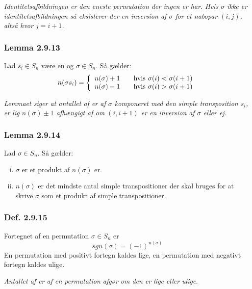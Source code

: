 \textit{Identitetsafbildningen er den eneste permutation der ingen
er har. Hvis $\sigma$ ikke er identitetsafbildningen så
eksisterer der en inversion af $\sigma$ for et nabopar $(i, j)$, altså hvor $j
= i + 1$.}

\subsubsection{Lemma 2.9.13}
Lad $s_i \in S_n$ være en  og $\sigma
\in S_n$. Så gælder:
\begin{equation*}
n(\sigma s_i) = \left\{
\begin{array}{l l}
n(\sigma) + 1 & \quad \text{hvis $\sigma(i) < \sigma(i + 1)$}\\
n(\sigma) - 1 & \quad \text{hvis $\sigma(i) > \sigma(i + 1)$}\\
\end{array} \right.
\end{equation*}

\textit{Lemmaet siger at antallet af er af $\sigma$
komponeret med den simple transposition $s_i$, er lig $n(\sigma) \pm 1$
afhængigt af om $(i, i + 1)$ er en inversion af $\sigma$ eller ej.}

\subsubsection{Lemma 2.9.14}
Lad $\sigma \in S_n$. Så gælder:
\begin{enumerate}[(i)]
  \item $\sigma$ er et produkt af $n(\sigma)$ er.
  \item $n(\sigma)$ er det mindste antal simple transpositioner der skal bruges
  for at skrive $\sigma$ som et produkt af simple transpositioner.
\end{enumerate}

\subsubsection{Def. 2.9.15}
Fortegnet af en permutation $\sigma \in S_n$ er
\begin{equation*}
  sgn(\sigma) = (-1)^{n(\sigma)}
\end{equation*}
En permutation med positivt fortegn kaldes lige, en permutation med negativt
fortegn kaldes ulige.

\textit{Antallet af er af en permutation afgør om den er
lige eller ulige.}

